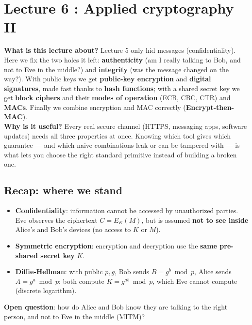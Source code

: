 \chapter{Lecture 6 : Applied cryptography II}

\begin{rembox}[title=In a nutshell]
\textbf{What is this lecture about?} Lecture 5 only hid messages (confidentiality). Here we
fix the two holes it left: \textbf{authenticity} (am I really talking to Bob, and not to
Eve in the middle?) and \textbf{integrity} (was the message changed on the way?). With
public keys we get \textbf{public-key encryption} and \textbf{digital signatures}, made
fast thanks to \textbf{hash functions}; with a shared secret key we get \textbf{block
ciphers} and their \textbf{modes of operation} (ECB, CBC, CTR) and \textbf{MACs}. Finally
we combine encryption and MAC correctly (\textbf{Encrypt-then-MAC}). \\
\textbf{Why is it useful?} Every real secure channel (HTTPS, messaging apps, software
updates) needs all three properties at once. Knowing which tool gives which guarantee
--- and which naive combinations leak or can be tampered with --- is what lets you
choose the right standard primitive instead of building a broken one.
\end{rembox}

\section{Recap: where we stand}

\begin{rembox}[title=Recap of Lecture 5]
\begin{itemize}
  \item \textbf{Confidentiality}: information cannot be accessed by unauthorized
        parties. Eve observes the ciphertext $C = E_K(M)$, but is assumed \textbf{not to
        see inside} Alice's and Bob's devices (no access to $K$ or $M$).
  \item \textbf{Symmetric encryption}: encryption and decryption use the \textbf{same
        pre-shared secret key} $K$.
  \item \textbf{Diffie-Hellman}: with public $p, g$, Bob sends $B = g^b \bmod p$, Alice
        sends $A = g^a \bmod p$; both compute $K = g^{ab} \bmod p$, which Eve cannot
        compute (discrete logarithm).
\end{itemize}
\textbf{Open question}: how do Alice and Bob know they are talking to the right person,
and not to Eve in the middle (MITM)?
\end{rembox}

